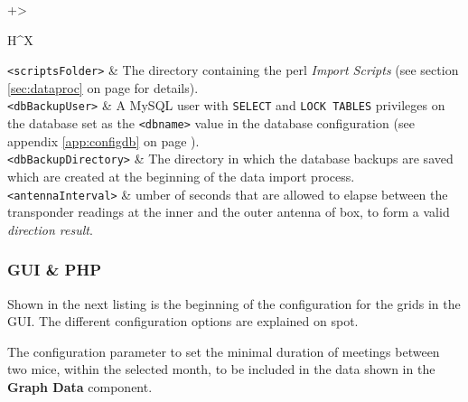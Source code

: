 \documentclass[a4paper,10pt,twoside,titlepage,headings=small,bibliography=totocnumbered,headsepline]{scrartcl}
\begin{document}
\begin{appendix}


\begin{center} 
\renewcommand\arraystretch{2}
\begin{tabularx}{\textwidth}{+>{\raggedright\arraybackslash}H^X}
\lstinline|<scriptsFolder>|	&	The directory containing the perl \textit{Import Scripts} (see section \ref{sec:dataproc} on page \pageref{sec:dataproc} for details). \\ 
\lstinline|<dbBackupUser>|	&	A MySQL user with \lstinline|SELECT| and \lstinline|LOCK TABLES| privileges on the database set as the \lstinline|<dbname>| value in the database configuration (see appendix \ref{app:configdb} on page \pageref{app:configdb}). \\ 
\lstinline|<dbBackupDirectory>|	&	The directory in which the database backups are saved which are created at the beginning of the data import process. \\ 
\lstinline|<antennaInterval>|	&	 umber of seconds that are allowed to elapse between the transponder readings at the inner and the outer antenna of box, to form a valid \textit{direction result}.\\ 
\end{tabularx}
\label{tab:perl_config}
\end{center} 

\subsubsection{GUI \& PHP}
\label{app:configfrontend}




Shown in the next listing is the beginning of the configuration for the grids in the GUI. The different configuration options are explained on spot.



The configuration parameter to set the minimal duration of meetings between two mice, within the selected month, to be included in the data shown in the \textbf{Graph Data} component. 


\end{appendix}
\end{document}
